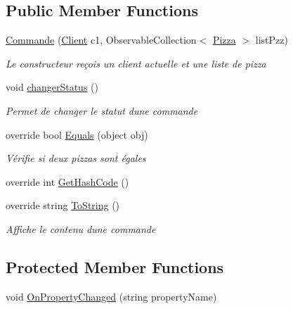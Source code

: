 \subsection*{Public Member Functions}
\begin{DoxyCompactItemize}
\item 
\hyperlink{classModele_1_1Commande_a998dd9a12105bc2fe0f78764a8eb2306}{Commande} (\hyperlink{classModele_1_1Client}{Client} c1, Observable\+Collection$<$ \hyperlink{classModele_1_1Pizza}{Pizza} $>$ list\+Pzz)
\begin{DoxyCompactList}\small\item\em Le constructeur reçois un client actuelle et une liste de pizza \end{DoxyCompactList}\item 
void \hyperlink{classModele_1_1Commande_ab3f6329bfa0cf9e06a2fb15184c490c3}{changer\+Status} ()
\begin{DoxyCompactList}\small\item\em Permet de changer le statut d\textquotesingle{}une commande \end{DoxyCompactList}\item 
override bool \hyperlink{classModele_1_1Commande_a0a87dd164ca4c925c15fc4ec122f39a7}{Equals} (object obj)
\begin{DoxyCompactList}\small\item\em Vérifie si deux pizzas sont égales \end{DoxyCompactList}\item 
override int \hyperlink{classModele_1_1Commande_a1e9a7e7bd98ad29127d0a228378568be}{Get\+Hash\+Code} ()
\item 
override string \hyperlink{classModele_1_1Commande_a4a4798336c80ca5656360983348472b0}{To\+String} ()
\begin{DoxyCompactList}\small\item\em Affiche le contenu d\textquotesingle{}une commande \end{DoxyCompactList}\end{DoxyCompactItemize}
\subsection*{Protected Member Functions}
\begin{DoxyCompactItemize}
\item 
void \hyperlink{classModele_1_1Commande_a81e35543bb9d8de1b01f8dd4ba0d3f38}{On\+Property\+Changed} (string property\+Name)
\end{DoxyCompactItemize}
